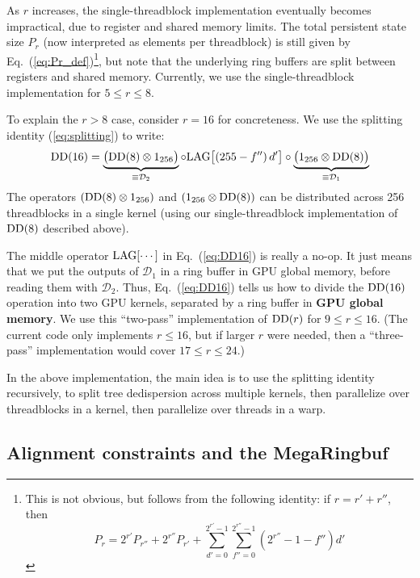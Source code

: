 \documentclass{article}
\numberwithin{equation}{section}   %
\def\DD{{\rm DD}}
\def\LAG{{\rm LAG}}
\begin{document}
As $r$ increases, the single-threadblock implementation eventually becomes impractical,
due to register and shared memory limits.
The total persistent state size $P_r$ (now interpreted as elements per threadblock) 
is still given by Eq.\ (\ref{eq:Pr_def})\footnote{This is not obvious, but follows from
the following identity: if $r=r'+r''$, then
\begin{equation}
P_r = 2^{r'} P_{r''} + 2^{r''} P_{r'} 
+ \sum_{d'=0}^{2^{r'}-1} \sum_{f''=0}^{2^{r''}-1} (2^{r''}-1-f'') d'
\end{equation}}, but note that the underlying ring buffers
are split between registers and shared memory.
Currently, we use the single-threadblock implementation for $5 \le r \le 8$.

To explain the $r > 8$ case, consider $r=16$ for concreteness.
We use the splitting identity (\ref{eq:splitting}) to write:
\begin{equation}
\DD(16) = \underbrace{\big( \DD(8) \otimes 1_{256} \big)}_{\equiv {\mathcal D}_2}
   \circ \LAG\big[ (255-f'') \, d' \big] 
   \circ \underbrace{\big( 1_{256} \otimes \DD(8) \big)}_{\equiv {\mathcal D}_1}
\label{eq:DD16}
\end{equation}
The operators $(\DD(8) \otimes 1_{256})$ and $(1_{256} \otimes \DD(8))$ can be distributed
across 256 threadblocks in a single kernel (using our single-threadblock implementation 
of $\DD(8)$ described above).

The middle operator $\LAG[\cdots]$ in Eq.\ (\ref{eq:DD16}) is really a no-op.
It just means that we put the outputs of ${\mathcal D}_1$ in a ring buffer in GPU global memory,
before reading them with ${\mathcal D}_2$.
Thus, Eq.\ (\ref{eq:DD16}) tells us how to divide the $\DD(16)$ operation into two GPU kernels,
separated by a ring buffer in {\bf GPU global memory}.
We use this ``two-pass'' implementation of $\DD(r)$ for $9 \le r \le 16$.
(The current code only implements $r \le 16$, but if larger $r$ were needed, then a ``three-pass''
implementation would cover $17 \le r \le 24$.)

In the above implementation, the main idea is to use the splitting identity recursively, to
split tree dedispersion across multiple kernels, then parallelize over threadblocks in a kernel,
then parallelize over threads in a warp.

\subsection{Alignment constraints and the MegaRingbuf}
\label{ssec:dd_alignment}
\end{document}
